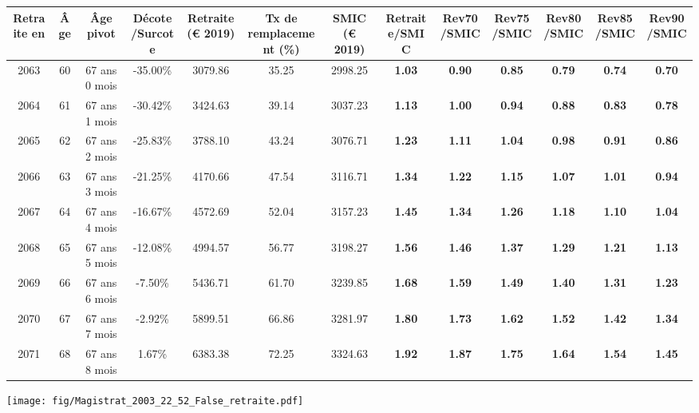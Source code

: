 { \scriptsize \begin{center} 
\begin{tabular}[htb]{|c|c||c|c||c|c||c||c|c|c|c|c|c|} 
\hline 
 Retraite en &  Âge &  Âge pivot &  Décote/Surcote &  Retraite (\euro{} 2019) &  Tx de remplacement (\%) &  SMIC (\euro{} 2019) &  Retraite/SMIC &  Rev70/SMIC &  Rev75/SMIC &  Rev80/SMIC &  Rev85/SMIC &  Rev90/SMIC \\ 
\hline \hline 
 2063 &  60 &  67 ans 0 mois &  -35.00\% &  3079.86 &  35.25 &  2998.25 &  {\bf 1.03} &  {\bf {\color{red} 0.90}} &  {\bf {\color{red} 0.85}} &  {\bf {\color{red} 0.79}} &  {\bf {\color{red} 0.74}} &  {\bf {\color{red} 0.70}} \\ 
\hline 
 2064 &  61 &  67 ans 1 mois &  -30.42\% &  3424.63 &  39.14 &  3037.23 &  {\bf 1.13} &  {\bf 1.00} &  {\bf {\color{red} 0.94}} &  {\bf {\color{red} 0.88}} &  {\bf {\color{red} 0.83}} &  {\bf {\color{red} 0.78}} \\ 
\hline 
 2065 &  62 &  67 ans 2 mois &  -25.83\% &  3788.10 &  43.24 &  3076.71 &  {\bf 1.23} &  {\bf 1.11} &  {\bf 1.04} &  {\bf {\color{red} 0.98}} &  {\bf {\color{red} 0.91}} &  {\bf {\color{red} 0.86}} \\ 
\hline 
 2066 &  63 &  67 ans 3 mois &  -21.25\% &  4170.66 &  47.54 &  3116.71 &  {\bf 1.34} &  {\bf 1.22} &  {\bf 1.15} &  {\bf 1.07} &  {\bf 1.01} &  {\bf {\color{red} 0.94}} \\ 
\hline 
 2067 &  64 &  67 ans 4 mois &  -16.67\% &  4572.69 &  52.04 &  3157.23 &  {\bf 1.45} &  {\bf 1.34} &  {\bf 1.26} &  {\bf 1.18} &  {\bf 1.10} &  {\bf 1.04} \\ 
\hline 
 2068 &  65 &  67 ans 5 mois &  -12.08\% &  4994.57 &  56.77 &  3198.27 &  {\bf 1.56} &  {\bf 1.46} &  {\bf 1.37} &  {\bf 1.29} &  {\bf 1.21} &  {\bf 1.13} \\ 
\hline 
 2069 &  66 &  67 ans 6 mois &  -7.50\% &  5436.71 &  61.70 &  3239.85 &  {\bf 1.68} &  {\bf 1.59} &  {\bf 1.49} &  {\bf 1.40} &  {\bf 1.31} &  {\bf 1.23} \\ 
\hline 
 2070 &  67 &  67 ans 7 mois &  -2.92\% &  5899.51 &  66.86 &  3281.97 &  {\bf 1.80} &  {\bf 1.73} &  {\bf 1.62} &  {\bf 1.52} &  {\bf 1.42} &  {\bf 1.34} \\ 
\hline 
 2071 &  68 &  67 ans 8 mois &  1.67\% &  6383.38 &  72.25 &  3324.63 &  {\bf 1.92} &  {\bf 1.87} &  {\bf 1.75} &  {\bf 1.64} &  {\bf 1.54} &  {\bf 1.45} \\ 
\hline 
\hline 
\end{tabular} 
\end{center} } 

 \begin{center}\texttt{[image: fig/Magistrat\_2003\_22\_52\_False\_retraite.pdf]}\end{center} 

\newpage 
 

